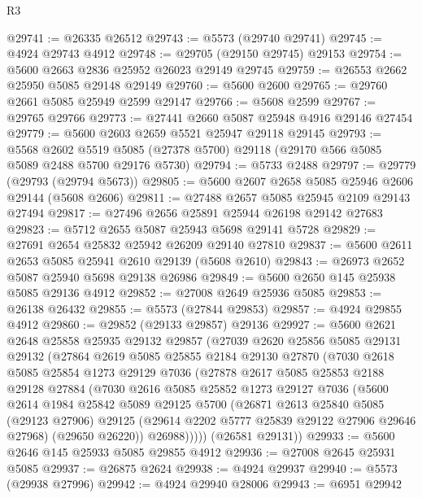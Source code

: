 \begin{lexlean}{R3}
\begin{coremodule}
@29741 := @26335 @26512
@29743 := @5573 (@29740 @29741)
@29745 := @4924 @29743 @4912
@29748 := @29705 (@29150 @29745) @29153
@29754 := @5600 @2663 @2836 @25952 @26023 @29149 @29745
@29759 := @26553 @2662 @25950 @5085 @29148 @29149
@29760 := @5600 @2600
@29765 := @29760 @2661 @5085 @25949 @2599 @29147
@29766 := @5608 @2599
@29767 := @29765 @29766
@29773 := @27441 @2660 @5087 @25948 @4916 @29146 @27454
@29779 := @5600 @2603 @2659 @5521 @25947 @29118 @29145
@29793 := @5568
    @2602
    @5519
    @5085
    (@27378 @5700)
    @29118
    (@29170 @566 @5085 @5089 @2488 @5700 @29176 @5730)
@29794 := @5733 @2488
@29797 := @29779 (@29793 (@29794 @5673))
@29805 := @5600 @2607 @2658 @5085 @25946 @2606 @29144 (@5608 @2606)
@29811 := @27488 @2657 @5085 @25945 @2109 @29143 @27494
@29817 := @27496 @2656 @25891 @25944 @26198 @29142 @27683
@29823 := @5712 @2655 @5087 @25943 @5698 @29141 @5728
@29829 := @27691 @2654 @25832 @25942 @26209 @29140 @27810
@29837 := @5600 @2611 @2653 @5085 @25941 @2610 @29139 (@5608 @2610)
@29843 := @26973 @2652 @5087 @25940 @5698 @29138 @26986
@29849 := @5600 @2650 @145 @25938 @5085 @29136 @4912
@29852 := @27008 @2649 @25936 @5085
@29853 := @26138 @26432
@29855 := @5573 (@27844 @29853)
@29857 := @4924 @29855 @4912
@29860 := @29852 (@29133 @29857) @29136
@29927 := @5600
    @2621
    @2648
    @25858
    @25935
    @29132
    @29857
    (@27039
      @2620
      @25856
      @5085
      @29131
      @29132
      (@27864
        @2619
        @5085
        @25855
        @2184
        @29130
        @27870
        (@7030
          @2618
          @5085
          @25854
          @1273
          @29129
          @7036
          (@27878
            @2617
            @5085
            @25853
            @2188
            @29128
            @27884
            (@7030
              @2616
              @5085
              @25852
              @1273
              @29127
              @7036
              (@5600
                @2614
                @1984
                @25842
                @5089
                @29125
                @5700
                (@26871
                  @2613
                  @25840
                  @5085
                  (@29123 @27906)
                  @29125
                  (@29614 @2202 @5777 @25839 @29122 @27906 @29646 @27968)
                  (@29650 @26220))
                @26988)))))
      (@26581 @29131))
@29933 := @5600 @2646 @145 @25933 @5085 @29855 @4912
@29936 := @27008 @2645 @25931 @5085
@29937 := @26875 @2624
@29938 := @4924 @29937
@29940 := @5573 (@29938 @27996)
@29942 := @4924 @29940 @28006
@29943 := @6951 @29942

\end{coremodule}
\end{lexlean}
